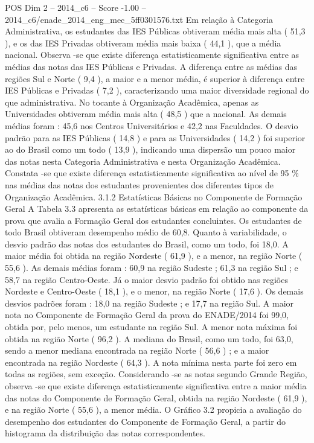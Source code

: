 \begin{textsample}{POS Dim 2 – 2014\_c6 – Score -1.00 – 2014\_c6/enade\_2014\_eng\_mec\_5ff0301576.txt}
Em relação à Categoria Administrativa, os estudantes das IES Públicas obtiveram média mais alta ( 51,3 ), e os das IES Privadas obtiveram média mais baixa ( 44,1 ), que a média nacional.
Observa -se que existe diferença estatisticamente significativa entre as médias das notas das IES Públicas e Privadas.
A diferença entre as médias das regiões Sul e Norte ( 9,4 ), a maior e a menor média, é superior à diferença entre IES Públicas e Privadas ( 7,2 ), caracterizando uma maior diversidade regional do que administrativa.
No tocante à Organização Acadêmica, apenas as Universidades obtiveram média mais alta ( 48,5 ) que a nacional.
As demais médias foram : 45,6 nos Centros Universitários e 42,2 nas Faculdades.
O desvio padrão para as IES Públicas ( 14,8 ) e para as Universidades ( 14,2 ) foi superior ao do Brasil como um todo ( 13,9 ), indicando uma dispersão um pouco maior das notas nesta Categoria Administrativa e nesta Organização Acadêmica.
Constata -se que existe diferença estatisticamente significativa ao nível de 95 \% nas médias das notas dos estudantes provenientes dos diferentes tipos de Organização Acadêmica. 3.1.2 Estatísticas Básicas no Componente de Formação Geral A Tabela 3.3 apresenta as estatísticas básicas em relação ao componente da prova que avalia a Formação Geral dos estudantes concluintes.
Os estudantes de todo Brasil obtiveram desempenho médio de 60,8.
Quanto à variabilidade, o desvio padrão das notas dos estudantes do Brasil, como um todo, foi 18,0.
A maior média foi obtida na região Nordeste ( 61,9 ), e a menor, na região Norte ( 55,6 ).
As demais médias foram : 60,9 na região Sudeste ; 61,3 na região Sul ; e 58,7 na região Centro-Oeste.
Já o maior desvio padrão foi obtido nas regiões Nordeste e Centro-Oeste ( 18,1 ), e o menor, na região Norte ( 17,6 ).
Os demais desvios padrões foram : 18,0 na região Sudeste ; e 17,7 na região Sul.
A maior nota no Componente de Formação Geral da prova do ENADE/2014 foi 99,0, obtida por, pelo menos, um estudante na região Sul.
A menor nota máxima foi obtida na região Norte ( 96,2 ).
A mediana do Brasil, como um todo, foi 63,0, sendo a menor mediana encontrada na região Norte ( 56,6 ) ; e a maior encontrada na região Nordeste ( 64,3 ).
A nota mínima nesta parte foi zero em todas as regiões, sem exceção.
Considerando -se as notas segundo Grande Região, observa -se que existe diferença estatisticamente significativa entre a maior média das notas do Componente de Formação Geral, obtida na região Nordeste ( 61,9 ), e na região Norte ( 55,6 ), a menor média.
O Gráfico 3.2 propicia a avaliação do desempenho dos estudantes do Componente de Formação Geral, a partir do histograma da distribuição das notas correspondentes.

\end{textsample}
